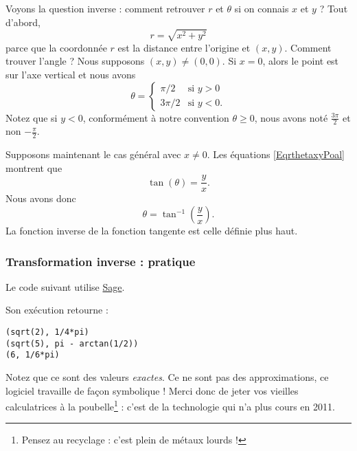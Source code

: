 Voyons la question inverse : comment retrouver $r$ et $\theta$ si on connais $x$ et $y$ ? Tout d'abord,
\begin{equation}
	r=\sqrt{x^2+y^2}
\end{equation}
parce que la coordonnée $r$ est la distance entre l'origine et $(x,y)$. Comment trouver l'angle ? Nous supposons $(x,y)\neq (0,0)$. Si $x=0$, alors le point est sur l'axe vertical et nous avons
\begin{equation}
	\theta=\begin{cases}
		\pi/2	&	\text{si $y>0$}\\
		3\pi/2	&	 \text{si $y<0$.}
	\end{cases}
\end{equation}
Notez que si $y<0$, conformément à notre convention $\theta\geq 0$, nous avons noté $\frac{ 3\pi }{2}$ et non $-\frac{ \pi }{ 2 }$.

Supposons maintenant le cas général avec $x\neq 0$. Les équations \eqref{EqrthetaxyPoal} montrent que
\begin{equation}
	\tan(\theta)=\frac{ y }{ x }.
\end{equation}
Nous avons donc
\begin{equation}
	\theta=\tan^{-1}\left( \frac{ y }{ x } \right).
\end{equation}
La fonction inverse de la fonction tangente est celle définie plus haut.

\subsubsection{Transformation inverse : pratique}

Le code suivant utilise \href{http://www.sagemath.org}{Sage}.



Son exécution retourne :
\begin{verbatim}
(sqrt(2), 1/4*pi)
(sqrt(5), pi - arctan(1/2))
(6, 1/6*pi)
\end{verbatim}
Notez que ce sont des valeurs \emph{exactes}. Ce ne sont pas des approximations, ce logiciel travaille de façon symbolique ! Merci donc de jeter vos vieilles calculatrices à la poubelle\footnote{Pensez au recyclage : c'est plein de métaux lourds !} : c'est de la technologie qui n'a plus cours en 2011.


